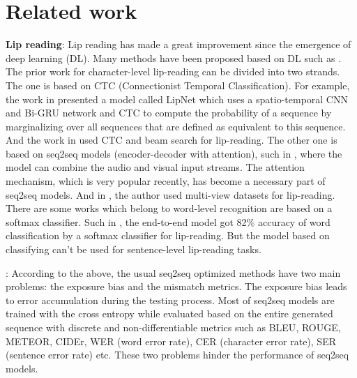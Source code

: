 \documentclass{bmvc2k}
\begin{document}
	\section{Related work}
	\vspace{-0.30cm} 
	{\bf Lip reading}: Lip reading has made a great improvement since the emergence of deep learning (DL). Many methods have been proposed based on DL such as \cite{Chung2018,Chung,Chung2017,B2017,Petridis2018,Assael2016,Afouras,Zhou2014,Yang2019}.     
	The prior work for character-level lip-reading can be divided into two strands\cite{Afouras}. The one is based on CTC (Connectionist Temporal Classification)\cite{Graves2006}. For example, the work in \cite{Assael2016} presented a model called LipNet which uses a spatio-temporal CNN and Bi-GRU network and CTC to compute the probability of a sequence by marginalizing over all sequences that are defined as equivalent to this sequence\cite{Assael2016}. And the work in \cite{Afouras} used CTC and beam search\cite{Wiseman2016} for lip-reading. The other one is based on seq2seq models (encoder-decoder with attention), such in \cite{Chung}, where the model can combine the audio and visual input streams. The attention mechanism\cite{Xu2014, Vaswani2017,HIWTC2014,Parikh2016}, which is very popular recently, has become a necessary part of seq2seq models. And in \cite{Chung2017}, the author used multi-view datasets for lip-reading. There are some works which belong to word-level recognition are based on a softmax classifier. Such in \cite{Petridis2018}, the end-to-end model got 82$\%$ accuracy of word classification by a softmax classifier for lip-reading. But the model based on classifying can't be used for sentence-level lip-reading tasks. 
	\vspace{0.2cm}
	
	: According to the above, the usual seq2seq optimized methods have two main problems: the exposure bias and the mismatch metrics. The exposure bias leads to error accumulation during the testing process. Most of seq2seq models are trained with the cross entropy while evaluated based on the entire generated sequence with discrete and non-differentiable metrics such as BLEU\cite{Papineni2002}, ROUGE\cite{Lin2001}, METEOR\cite{Banerjee2003}, CIDEr\cite{Tech}, WER (word error rate), CER (character error rate), SER (sentence error rate) etc. These two problems hinder the performance of seq2seq models.
	
\end{document}

